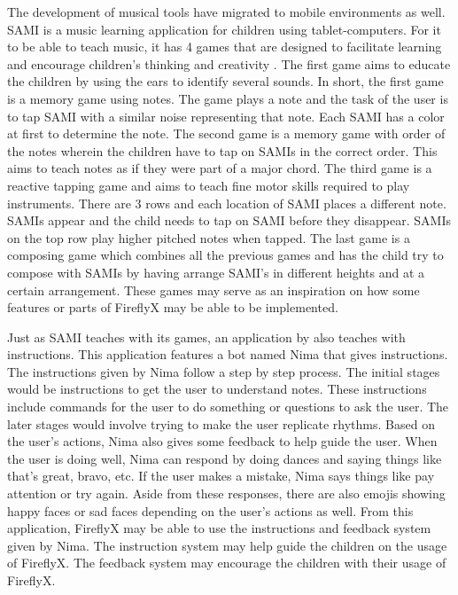 The development of musical tools have migrated to mobile environments as well. SAMI is a music learning application for children using tablet-computers. For it to be able to teach music, it has 4 games that are designed to facilitate learning and encourage children's thinking and creativity \cite{paule2017music}. The first game aims to educate the children by using the ears to identify several sounds. In short, the first game is a memory game using notes. The game plays a note and the task of the user is to tap SAMI with a similar noise representing that note. Each SAMI has a color at first to determine the note. The second game is a memory game with order of the notes wherein the children have to tap on SAMIs in the correct order. This aims to teach notes as if they were part of a major chord. The third game is a reactive tapping game and aims to teach fine motor skills required to play instruments. There are 3 rows and each location of SAMI places a different note. SAMIs appear and the child needs to tap on SAMI before they disappear. SAMIs on the top row play higher pitched notes when tapped. The last game is a composing game which combines all the previous games and has the child try to compose with SAMIs by having arrange SAMI’s in different heights and at a certain arrangement. These games may serve as an inspiration on how some features or parts of FireflyX may be able to be implemented.

Just as SAMI teaches with its games, an application by \cite{elahi2017xylotism} also teaches with instructions. This application features a bot named Nima that gives instructions. The instructions given by Nima follow a step by step process. The initial stages would be instructions to get the user to understand notes. These instructions include commands for the user to do something or questions to ask the user. The later stages would involve trying to make the user replicate rhythms. Based on the user's actions, Nima also gives some feedback to help guide the user. When the user is doing well, Nima can respond by doing dances and saying things like that's great, bravo, etc. If the user makes a mistake, Nima says things like pay attention or try again. Aside from these responses, there are also emojis showing happy faces or sad faces depending on the user's actions as well. From this application, FireflyX may be able to use the instructions and feedback system given by Nima. The instruction system may help guide the children on the usage of FireflyX. The feedback system may encourage the children with their usage of FireflyX.

